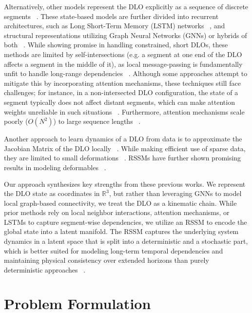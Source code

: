 \documentclass[letterpaper, 10 pt, conference]{ieeeconf}  %
\begin{document}
Alternatively, other models represent the DLO explicitly as a sequence of discrete segments ~\cite{yan_self-supervised_2020, gu_learning_2025, yue_lstm-gcn_2025, yu_hybrid_2025, yu_shape_2022, yang_learning_2021}. These state-based models are further divided into recurrent architectures, such as Long Short-Term Memory (LSTM) networks ~\cite{yan_self-supervised_2020, yang_learning_2021}, and structural representations utilizing Graph Neural Networks (GNNs) or hybrids of both ~\cite{yue_lstm-gcn_2025, yu_hybrid_2025, yu_shape_2022}. While showing promise in handling constrained, short DLOs, these methods are limited by self-intersections (e.g. a segment at one end of the DLO affects a segment in the middle of it), as local message-passing is fundamentally unfit to handle long-range dependencies ~\cite{alon_bottleneck_2021}. Although some approaches attempt to mitigate this by incorporating attention mechanisms, these techniques still face challenges; for instance, in a non-intersected DLO configuration, the state of a segment typically does not affect distant segments, which can make attention weights unreliable in such situations ~\cite{mudarisov_limitations_2025}. Furthermore, attention mechanisms scale poorly ($O(N^2)$) to large sequence lengths ~\cite{patro_mamba-360_2024}.

Another approach to learn dynamics of a DLO from data is to approximate the Jacobian Matrix of the DLO locally ~\cite{yu_global_2023, jin_robust_2019}. While making efficient use of sparse data, they are limited to small deformations ~\cite{gu_survey_2023}. RSSMs have further shown promising results in modeling deformables ~\cite{li_deformnet_2024}. 

Our approach synthesizes key strengths from these previous works. We represent the DLO state as coordinates in $\mathbb{R}^3$, but rather than leveraging GNNs to model local graph-based connectivity, we treat the DLO as a kinematic chain. While prior methods rely on local neighbor interactions, attention mechanisms, or LSTMs to capture segment-wise dependencies, we utilize an RSSM to encode the global state into a latent manifold. The RSSM captures the underlying system dynamics in a latent space that is split into a deterministic and a stochastic part, which is better suited for modeling long-term temporal dependencies and maintaining physical consistency over extended horizons than purely deterministic approaches ~\cite{hafner_learning_2019, hafner_dream_2020}. 


\section{Problem Formulation}
\label{sec:problem}
\end{document}
